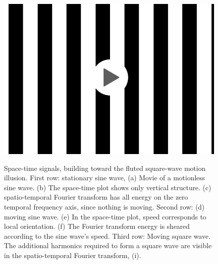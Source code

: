 \begin{figure}
{\hspace{0.5}
}
\centerline{
{
\href{https://groups.csail.mit.edu/vision/cvbook/videos/movingSquareLoop.mov}{\includegraphics[width=0.2\linewidth]{figures/temporal_filters/movie3.jpg}}}
\hspace{-0.8}
\hspace{-0.1in}
}
\caption{Space-time signals, building toward the fluted square-wave motion illusion.    First row: stationary sine wave, (a) Movie of a motionless sine wave. (b) The space-time plot shows only vertical structure. 
(c) spatio-temporal Fourier transform has all energy on the zero temporal frequency axis, since nothing is moving.
Second row:  (d) moving sine wave. (e) In the space-time plot, speed corresponds to local orientation. (f) The Fourier transform energy is sheared according to the sine wave's speed.   
Third row:  Moving square wave.  The additional harmonics required to form a square wave are visible in the spatio-temporal Fourier transform, (i).  }
\label{fig:motionIllusion1}
\end{figure}

